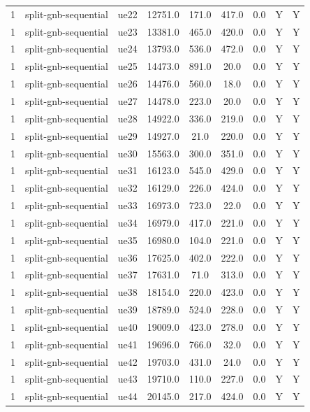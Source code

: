 \begin{table}[ht]
\begin{tabular}{|c|c|c|c|c|c|c|c|c|}
1 & split-gnb-sequential & ue22 & 12751.0 & 171.0 & 417.0 & 0.0 & Y & Y \\
1 & split-gnb-sequential & ue23 & 13381.0 & 465.0 & 420.0 & 0.0 & Y & Y \\
1 & split-gnb-sequential & ue24 & 13793.0 & 536.0 & 472.0 & 0.0 & Y & Y \\
1 & split-gnb-sequential & ue25 & 14473.0 & 891.0 & 20.0 & 0.0 & Y & Y \\
1 & split-gnb-sequential & ue26 & 14476.0 & 560.0 & 18.0 & 0.0 & Y & Y \\
1 & split-gnb-sequential & ue27 & 14478.0 & 223.0 & 20.0 & 0.0 & Y & Y \\
1 & split-gnb-sequential & ue28 & 14922.0 & 336.0 & 219.0 & 0.0 & Y & Y \\
1 & split-gnb-sequential & ue29 & 14927.0 & 21.0 & 220.0 & 0.0 & Y & Y \\
1 & split-gnb-sequential & ue30 & 15563.0 & 300.0 & 351.0 & 0.0 & Y & Y \\
1 & split-gnb-sequential & ue31 & 16123.0 & 545.0 & 429.0 & 0.0 & Y & Y \\
1 & split-gnb-sequential & ue32 & 16129.0 & 226.0 & 424.0 & 0.0 & Y & Y \\
1 & split-gnb-sequential & ue33 & 16973.0 & 723.0 & 22.0 & 0.0 & Y & Y \\
1 & split-gnb-sequential & ue34 & 16979.0 & 417.0 & 221.0 & 0.0 & Y & Y \\
1 & split-gnb-sequential & ue35 & 16980.0 & 104.0 & 221.0 & 0.0 & Y & Y \\
1 & split-gnb-sequential & ue36 & 17625.0 & 402.0 & 222.0 & 0.0 & Y & Y \\
1 & split-gnb-sequential & ue37 & 17631.0 & 71.0 & 313.0 & 0.0 & Y & Y \\
1 & split-gnb-sequential & ue38 & 18154.0 & 220.0 & 423.0 & 0.0 & Y & Y \\
1 & split-gnb-sequential & ue39 & 18789.0 & 524.0 & 228.0 & 0.0 & Y & Y \\
1 & split-gnb-sequential & ue40 & 19009.0 & 423.0 & 278.0 & 0.0 & Y & Y \\
1 & split-gnb-sequential & ue41 & 19696.0 & 766.0 & 32.0 & 0.0 & Y & Y \\
1 & split-gnb-sequential & ue42 & 19703.0 & 431.0 & 24.0 & 0.0 & Y & Y \\
1 & split-gnb-sequential & ue43 & 19710.0 & 110.0 & 227.0 & 0.0 & Y & Y \\
1 & split-gnb-sequential & ue44 & 20145.0 & 217.0 & 424.0 & 0.0 & Y & Y \\

\end{tabular}
\end{table}
